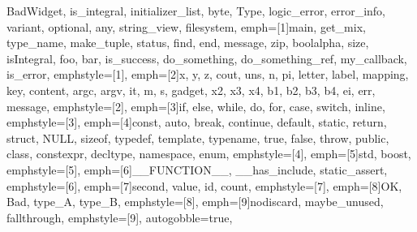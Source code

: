 {{              BadWidget, is_integral, initializer_list, byte, Type, logic_error,
              error_info, variant, optional, any, string_view, filesystem},
emph=[1]{main, get_mix, type_name, make_tuple, status, find, end, message, zip, boolalpha, size,
         isIntegral,  foo, bar, is_success, do_something, do_something_ref, my_callback, is_error},
emphstyle=[1]{\color{NavyBlue}}, %
emph=[2]{x, y, z, cout, uns, n, pi, letter, label, mapping, key, content, argc, argv, it, m, s,
         gadget, x2, x3, x4, b1, b2, b3, b4, ei, err, message},
emphstyle=[2]{\color{Orange}}, %
emph=[3]{if, else, while, do, for, case, switch, inline},
emphstyle=[3]{\color{violet}}, %
emph=[4]{const, auto, break, continue, default, static, return, struct, NULL, sizeof, typedef,
         template, typename, true, false, throw, public, class, constexpr, decltype, namespace, enum},
emphstyle=[4]{\color{ProcessBlue}}, %
emph=[5]{std, boost},
emphstyle=[5]{\color{Maroon}}, %
emph=[6]{__FUNCTION__, __has_include, static_assert},
emphstyle=[6]{\color{Gray}}, %
emph=[7]{second, value, id, count},
emphstyle=[7]{\color{Peach!50!Purple}}, %
emph=[8]{OK, Bad, type_A, type_B},
emphstyle=[8]{\color{Blue}}, %
emph=[9]{nodiscard, maybe_unused, fallthrough},
emphstyle=[9]{\color{Goldenrod!50!black}}, %
autogobble=true, %
}


